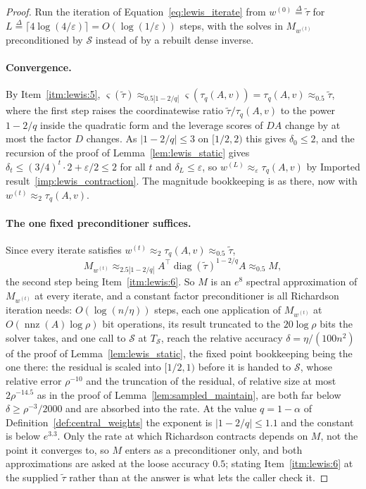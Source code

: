 \documentclass[11pt]{article}
\newcommand{\diag}{\operatorname{diag}}
\newcommand{\nnz}{\operatorname{nnz}}
\newcommand{\tautil}{\widetilde{\tau}}
\newcommand{\defeq}{\stackrel{\Delta}{=}}
\begin{document}
\begin{proof}
Run the iteration of Equation~\eqref{eq:lewis_iterate} from
$w^{(0)} \defeq \tautil$ for
$L \defeq \lceil 4 \log(4 / \varepsilon) \rceil = O(\log(1 / \varepsilon))$
steps, with the solves in $M_{w^{(t)}}$ preconditioned by
$\mathcal{S}$ instead of by a rebuilt dense inverse.

\paragraph{Convergence.}
By Item~\ref{itm:lewis:5},
$\varsigma(\tautil) \approx_{0.5 |1 - 2/q|} \varsigma(\tau_{q}(A, v)) = \tau_{q}(A, v) \approx_{0.5} \tautil$,
where the first step raises the coordinatewise ratio $\tautil / \tau_{q}(A, v)$
to the power $1 - 2/q$ inside the quadratic form and the leverage scores of
$D A$ change by at most the factor
$D$ changes.
As $|1 - 2/q| \le 3$ on
$[1/2, 2)$ this gives
$\delta_0 \le 2$, and the recursion of the proof of Lemma~\ref{lem:lewis_static}
gives $\delta_t \le (3/4)^{t} \cdot 2 + \varepsilon / 2 \le 2$ for all
$t$ and
$\delta_L \le \varepsilon$, so
$w^{(L)} \approx_{\varepsilon} \tau_{q}(A, v)$ by Imported
result~\ref{imp:lewis_contraction}.
The magnitude bookkeeping is as there, now with
$w^{(t)} \approx_{2} \tau_{q}(A, v)$.

\paragraph{The one fixed preconditioner suffices.}
Since every iterate satisfies
$w^{(t)} \approx_{2} \tau_{q}(A, v) \approx_{0.5} \tautil$,
\[
M_{w^{(t)}}
\approx_{2.5 |1 - 2/q|}
A^{\top} \diag(\tautil)^{1 - 2/q} A
\approx_{0.5}
M ,
\]
the second step being Item~\ref{itm:lewis:6}.
So $M$ is an
$e^{8}$ spectral approximation of
$M_{w^{(t)}}$ at every iterate, and a constant factor preconditioner is all
Richardson iteration needs: $O(\log(n / \eta))$ steps, each one application of
$M_{w^{(t)}}$ at
$O(\nnz(A) \log \rho)$ bit operations, its result truncated to the
$20 \log \rho$ bits the solver takes, and one call to
$\mathcal{S}$ at
$T_{\mathcal{S}}$, reach the relative accuracy
$\delta = \eta / (100 n^{2})$ of the proof of Lemma~\ref{lem:lewis_static}, the
fixed point bookkeeping being the one there: the residual is scaled into
$[1/2, 1)$ before it is handed to
$\mathcal{S}$, whose relative error
$\rho^{-10}$ and the truncation of the residual, of relative size at most
$2 \rho^{-14.5}$ as in the proof of Lemma~\ref{lem:sampled_maintain}, are both
far below $\delta \ge \rho^{-3} / 2000$ and are absorbed into the rate.
At the value $q = 1 - \alpha$ of Definition~\ref{def:central_weights} the
exponent is $|1 - 2/q| \le 1.1$ and the constant is below
$e^{3.3}$.
Only the rate at which Richardson contracts depends on $M$, not the point it
converges to, so $M$ enters as a preconditioner only, and both approximations
are asked at the loose accuracy $0.5$; stating Item~\ref{itm:lewis:6} at the
supplied $\tautil$ rather than at the answer is what lets the caller check it.


\end{proof}
\end{document}
